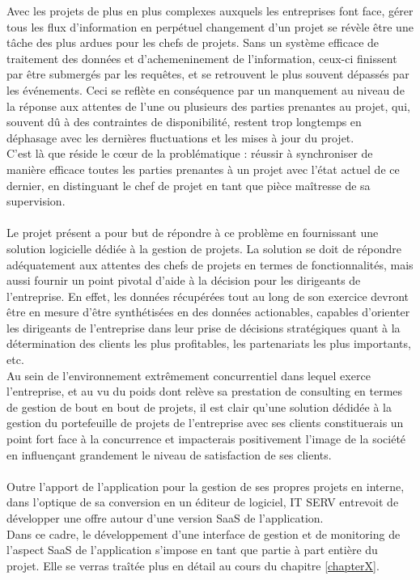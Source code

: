 \begin{spacing}{1.5}
Avec les projets de plus en plus complexes auxquels les entreprises font face, gérer tous les flux d'information en perpétuel changement d'un projet se révèle être une tâche des plus ardues pour les chefs de projets. Sans un système efficace de traitement des données et d'achemeninement de l'information, ceux-ci finissent par être submergés par les requêtes, et se retrouvent le plus souvent dépassés par les événements. Ceci se reflète en conséquence par un manquement au niveau de la réponse aux attentes de l'une ou plusieurs des parties prenantes au projet, qui, souvent dû à des contraintes de disponibilité, restent trop longtemps en déphasage avec les dernières fluctuations et les mises à jour du projet.\\
C'est là que réside le cœur de la problématique : réussir à synchroniser de manière efficace toutes les parties prenantes à un projet avec l'état actuel de ce dernier, en distinguant le chef de projet en tant que pièce maîtresse de sa supervision.\\
\\
Le projet présent a pour but de répondre à ce problème en fournissant une solution logicielle dédiée à la gestion de projets. La solution se doit de répondre adéquatement aux attentes des chefs de projets en termes de fonctionnalités, mais aussi fournir un point pivotal d'aide à la décision pour les dirigeants de l'entreprise. En effet, les données récupérées tout au long de son exercice devront être en mesure d'être synthétisées en des données actionables, capables d'orienter les dirigeants de l'entreprise dans leur prise de décisions stratégiques quant à la détermination des clients les plus profitables, les partenariats les plus importants, etc.\\
Au sein de l'environnement extrêmement concurrentiel dans lequel exerce l'entreprise, et au vu du poids dont relève sa prestation de consulting en termes de gestion de bout en bout de projets, il est clair qu'une solution dédidée à la gestion du portefeuille de projets de l'entreprise avec ses clients constituerais un point fort face à la concurrence et impacterais positivement l'image de la société en influençant grandement le niveau de satisfaction de ses clients.\\
\\
Outre l'apport de l'application pour la gestion de ses propres projets en interne, dans l'optique de sa conversion en un éditeur de logiciel, IT SERV entrevoit de développer une offre autour d'une version SaaS de l'application.\\
 Dans ce cadre, le développement d'une interface de gestion et de monitoring de l'aspect SaaS de l'application s'impose en tant que partie à part entière du projet. Elle se verras traîtée plus en détail au cours du chapitre \ref{chapterX}.



\end{spacing}
